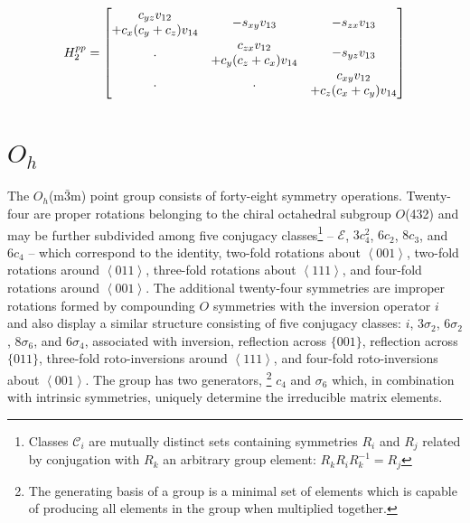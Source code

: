 \documentclass[twocolumn,showpacs,preprintnumbers,superscriptaddress,prb,floatfix,aps,10pt]{revtex4-1}
\newcommand*{\class}{\mathcal{C}}
\newcommand*{\id}{\mathcal{E}}
\begin{document}
\begin{equation}
H^{pp}_2 =
\begin{bmatrix}
              c_{yz} v_{12} & \multirow{2}{*}{$-s_{xy} v_{13}$} & \multirow{2}{*}{$-s_{zx} v_{13}$}  \\
+c_{x} (c_{y}+c_{z}) v_{14} &                                   &                                    \\
\multirow{2}{*}{.}          &               c_{zx} v_{12}       & \multirow{2}{*}{$-s_{yz} v_{13}$}  \\
                            & +c_{y} (c_{z}+c_{x}) v_{14}       &                                    \\
\multirow{2}{*}{.}          & \multirow{2}{*}{.}                &          c_{xy} v_{12}             \\ 
                            &                                   &        +c_{z} (c_{x}+c_{y}) v_{14} \\
\end{bmatrix}
\end{equation}






\section{$O_h$}
\label{appendix:pg}
The $O_h$(m$\bar{3}$m) point group consists of forty-eight symmetry operations. Twenty-four are proper rotations belonging to the chiral octahedral subgroup $O$(432) and may be further subdivided among five conjugacy classes\footnote{Classes $\class_i$ are mutually distinct sets containing symmetries $R_i$ and $R_j$ related by conjugation with $R_k$ an arbitrary group element: $R_kR_iR_k^{-1}=R_j$} --  $\id$, $3c_4^2$, $6c_2$, $8c_3$, and $6c_4$ -- which correspond to the identity, two-fold rotations about $\left<001\right>$, two-fold rotations around $\left<011\right>$, three-fold rotations about $\left<111\right>$, and four-fold rotations around $\left<001\right>$. The additional twenty-four symmetries are improper rotations formed by compounding $O$ symmetries with the inversion operator $i$ and also display a similar structure consisting of five conjugacy classes: $i$, $3\sigma_2$, $6\sigma_2$, $8\sigma_6$, and $6\sigma_4$, associated with inversion, reflection across $\{001\}$, reflection across $\{011\}$, three-fold roto-inversions around $\left<111\right>$, and four-fold roto-inversions about $\left<001\right>$. The group has two generators, \footnote{The generating basis of a group is a minimal set of elements which is capable of producing all elements in the group when multiplied together.} $c_4$ and $\sigma_6$ which, in combination with intrinsic symmetries, uniquely determine the irreducible matrix elements.
\end{document}
